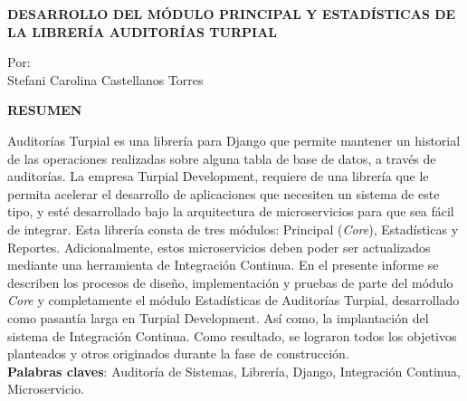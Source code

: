 \begin{center}
    \vspace{2cm}
    \textbf{
    DESARROLLO DEL MÓDULO PRINCIPAL Y ESTADÍSTICAS DE LA LIBRERÍA AUDITORÍAS TURPIAL
    }

    \vspace{2cm}

    Por:\\
    Stefani Carolina Castellanos Torres

    \vspace{2cm}

    \textbf{RESUMEN}\\

    \vspace{2cm}

\end{center}

Auditorías Turpial es una librería para Django que permite mantener un historial de las operaciones realizadas sobre alguna tabla de base de datos, a través de auditorías. La empresa Turpial Development, requiere de una librería que le permita acelerar el desarrollo de aplicaciones que necesiten un sistema de este tipo, y esté desarrollado bajo la arquitectura de microservicios para que sea fácil de integrar. Esta librería consta de tres módulos: Principal (\textit{Core}), Estadísticas y Reportes. Adicionalmente, estos microservicios deben poder ser actualizados mediante una herramienta de Integración Continua. En el presente informe se describen los procesos de diseño, implementación y pruebas de parte del módulo \textit{Core} y completamente el módulo Estadísticas de Auditorías Turpial, desarrollado como pasantía larga en Turpial Development. Así como, la implantación del sistema de Integración Continua. Como resultado, se lograron todos los objetivos planteados y otros originados durante la fase de construcción. \\

    \textbf{Palabras claves}: Auditoría de Sistemas, Librería, Django, Integración Continua, Microservicio.
